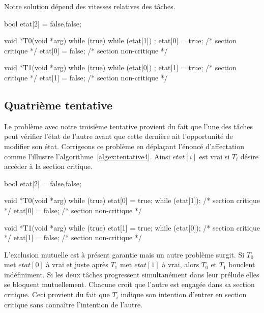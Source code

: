 \par\noindent
Notre solution dépend des vitesses relatives des tâches.

\begin{codeblock}[label=algex:tentative3, title={Troisième tentative d'exclusion mutuelle}]
bool etat[2] = {false,false};

void *T0(void *arg)
{
  while (true) {
    while (etat[1])
      ;
    etat[0] = true;
    /* section critique */
    etat[0] = false;
    /* section non-critique */
  }
}

void *T1(void *arg)
{
  while (true) {
    while (etat[0])
      ;
    etat[1] = true;
    /* section critique */
    etat[1] = false;
    /* section non-critique */
  }
}
\end{codeblock}

\subsection*{Quatrième tentative}
Le problème avec notre troisième tentative provient du fait que l'une des tâches peut vérifier l'état de l'autre avant que cette dernière ait l'opportunité de modifier son état.  Corrigeons ce problème en déplaçant l'énoncé d'affectation comme l'illustre l'algorithme~\ref{algex:tentative4}.
Ainsi $etat[i]$ est vrai si $T_i$ désire accéder à la section critique.

\begin{codeblock}[label=algex:tentative4, title={Quatrième tentative d'exclusion mutuelle}]
bool etat[2] = {false,false};

void *T0(void *arg)
{
  while (true) {
    etat[0] = true;
    while (etat[1]);
    /* section critique */
    etat[0] = false;
    /* section non-critique */
  }
}

void *T1(void *arg)
{
  while (true) {
    etat[1] = true;
    while (etat[0]);
    /* section critique */
    etat[1] = false;
    /* section non-critique */
  }
}
\end{codeblock}

L'exclusion mutuelle est à présent garantie mais un autre problème surgit.
Si $T_0$ met $etat[0]$ à vrai et juste après $T_1$ met $etat[1]$ à vrai, alors $T_0$ et $T_1$ bouclent indéfiniment.
Si les deux tâches progressent simultanément dans leur prélude elles se bloquent mutuellement.
Chacune croit que l'autre est engagée dans sa section critique.
Ceci provient du fait que $T_i$ indique son intention d'entrer en section critique sans connaître l'intention de l'autre.

